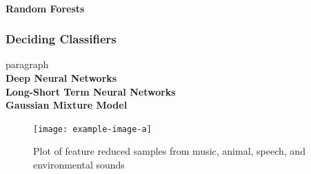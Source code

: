 \\
\textbf{Random Forests}
\\

\subsubsection{Deciding Classifiers}
paragraph
\\
\textbf{Deep Neural Networks}
\\
\textbf{Long-Short Term Neural Networks}
\\
\textbf{Gaussian Mixture Model}
\\

\begin{figure}
    \centering
    \texttt{[image: example-image-a]}
    \caption{Plot of feature reduced samples from music, animal, speech, and environmental sounds}
    \label{fig:top-dist}
\end{figure}

